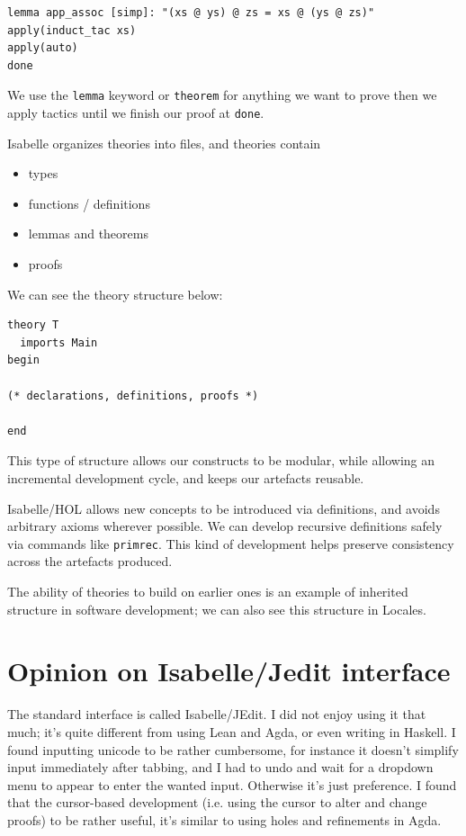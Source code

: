 \documentclass{article}
\begin{document}
\begin{lstlisting}
lemma app_assoc [simp]: "(xs @ ys) @ zs = xs @ (ys @ zs)"
apply(induct_tac xs)
apply(auto)
done
\end{lstlisting}

We use the \texttt{lemma} keyword or \texttt{theorem} for anything we want to prove
then we apply tactics until we finish our proof at \texttt{done}.

Isabelle organizes theories into files, and theories contain
\begin{itemize}
  \item types
  \item functions / definitions
  \item lemmas and theorems
  \item proofs
\end{itemize}

We can see the theory structure below:
\begin{lstlisting}
theory T
  imports Main
begin

(* declarations, definitions, proofs *)

end
\end{lstlisting}
This type of structure allows our constructs to be modular, while allowing an incremental
development cycle, and keeps our artefacts reusable.

Isabelle/HOL allows new concepts to be introduced via definitions, and avoids arbitrary axioms 
wherever possible. We can develop recursive definitions safely via commands like \texttt{primrec}.
This kind of development helps preserve consistency across the artefacts produced.

The ability of theories to build on earlier ones is an example of inherited structure in software development;
we can also see this structure in Locales.
\section{Opinion on Isabelle/Jedit interface}

The standard interface is called Isabelle/JEdit. I did not enjoy using it that much; it's quite different from using Lean and Agda, or even writing in Haskell.
I found inputting unicode to be rather cumbersome, for instance it doesn't simplify
input immediately after tabbing, and I had to undo and wait for a dropdown menu to appear to enter the wanted input.
Otherwise it's just preference. I found that the cursor-based development (i.e. using the cursor to alter and change proofs)
to be rather useful, it's similar to using holes and refinements in Agda.
\end{document}
